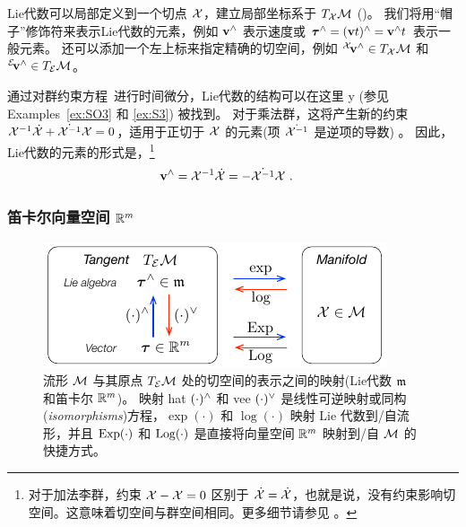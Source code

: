 Lie代数可以局部定义到一个切点 $\mathcal{X}$，建立局部坐标系于 $T_{\mathcal{X}}{\mathcal{M}}$
()。
我们将用“帽子”修饰符来表示Lie代数的元素，例如 ${\bf v}^\wedge$ 表示速度或 ${\bm \tau}^\wedge=({\bf v} t)^\wedge={\bf v}^\wedge t$ 表示一般元素。
还可以添加一个左上标来指定精确的切空间，例如 ${^{\mathcal{X}}}\!{\bf v}^\wedge\in T_{\mathcal{X}}{\mathcal{M}}$ 和 ${^{\mathcal{E}}}\!{\bf v}^\wedge\in T_{\mathcal{E}}{\mathcal{M}}$。



通过对群约束方程~进行时间微分，Lie代数的结构可以在这里%
%
\if \examples y (参见 Examples~\ref{ex:SO3} 和 \ref{ex:S3}) \else \fi 
%
被找到。
对于乘法群，这将产生新的约束 $\mathcal{X}^{-1}\dot{\mathcal{X}} + \dot{\mathcal{X}^{-1}}\mathcal{X} = 0$，适用于正切于 $\mathcal{X}$ 的元素(项 $\dot{\mathcal{X}^{-1}}$ 是逆项的导数) 。
因此，Lie代数的元素的形式是，\footnote{对于加法李群，约束 $\mathcal{X}-\mathcal{X}=0$ 区别于 $\dot{\mathcal{X}}=\dot{\mathcal{X}}$，也就是说，没有约束影响切空间。这意味着切空间与群空间相同。更多细节请参见  。}
%
\begin{align}\label{equ:tangent_structure}
{\bf v}^\wedge = \mathcal{X}^{-1}\dot{\mathcal{X}} &= -\dot{\mathcal{X}^{-1}}\mathcal{X}
~.
\end{align}
%



\subsubsection[The Cartesian vector space]{笛卡尔向量空间 ${\mathbb R}^m$}

\begin{figure}[tb]
\centering
\includegraphics{figures/maps}
\caption{流形 $\mathcal{M}$ 与其原点 $T_{\mathcal{E}}{\mathcal{M}}$ 处的切空间的表示之间的映射(Lie代数 $\frak{m}$ 和笛卡尔 ${\mathbb R}^m$)。
映射 hat $(\cdot)^\wedge$ 和 vee $(\cdot)^\vee$ 是线性可逆映射或同构(\emph{isomorphisms})方程，$\exp(\cdot)$ 和 $\log(\cdot)$ 映射 Lie 代数到/自流形，并且 $\operatorname*{Exp}(\cdot)$ 和 $\operatorname*{Log}(\cdot)$ 是直接将向量空间 ${\mathbb R}^m$ 映射到/自 $\mathcal{M}$ 的快捷方式。}%
\label{fig:maps}%
\end{figure}%


